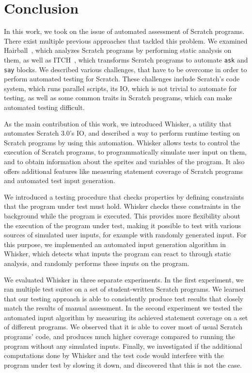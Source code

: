 \chapter{Conclusion}
\label{cha:conclusion}

In this work, we took on the issue of automated assessment of Scratch programs.
There exist multiple previous approaches that tackled this problem.
We examined Hairball~\cite{hairball}, which analyzes Scratch programs by performing static analysis on them,
as well as ITCH~\cite{itch}, which transforms Scratch programs to automate \texttt{ask} and \texttt{say} blocks.
We described various challenges, that have to be overcome in order to perform automated testing for Scratch.
These challenges include Scratch's code system, which runs parallel scripts, its IO, which is not trivial to automate for testing,
as well as some common traits in Scratch programs, which can make automated testing difficult.
\parspace

As the main contribution of this work, we introduced Whisker, a utility that automates Scratch 3.0's IO,
and described a way to perform runtime testing on Scratch programs by using this automation.
Whisker allows tests to control the execution of Scratch programs,
to programmatically simulate user input on them,
and to obtain information about the sprites and variables of the program.
It also offers additional features like measuring statement coverage of Scratch programs
and automated test input generation.
\parspace

We introduced a testing procedure that checks properties by defining constraints that the program under test must hold.
Whisker checks these constraints in the background while the program is executed.
This provides more flexibility about the execution of the program under test,
making it possible to test with various sources of simulated user inputs, for example with randomly generated input.
For this purpose, we implemented an automated input generation algorithm in Whisker,
which detects what inputs the program can react to through static analysis, and randomly performs these inputs on the program.
\parspace

We evaluated Whisker in three separate experiments.
In the first experiment, we ran multiple test suites on a set of student-written Scratch programs.
We learned that our testing approach is able to consistently produce test results that closely match the results of manual assessment.
In the second experiment we tested the automated input algorithm by measuring its achieved statement coverage
on a set of different programs.
We observed that it is able to cover most of usual Scratch programs' code,
and produces much higher coverage compared to running the program without any simulated inputs.
Finally, we investigated if the additional computations done by Whisker and the test code would interfere with the program under test
by slowing it down, and discovered that this is not the case.
\parspace

